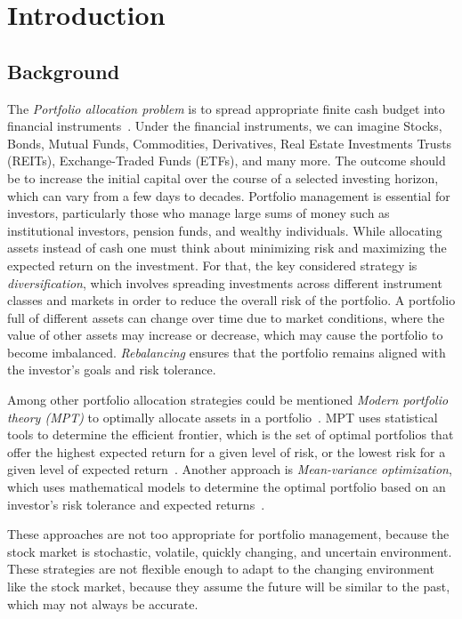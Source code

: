 \documentclass[../xlapes02]{subfiles}
\begin{document}
    \chapter{Introduction}\label{ch:introduction}


    \section{Background}\label{sec:background}
    The \emph{Portfolio allocation problem} is to spread appropriate finite cash budget into financial instruments~\cite{Model-Free-Reinforcement-Learning-for-Asset-Allocation}. Under the financial instruments, we can imagine Stocks, Bonds, Mutual Funds, Commodities, Derivatives, Real Estate Investments Trusts (REITs), Exchange-Traded Funds (ETFs), and many more. The outcome should be to increase the initial capital over the course of a selected investing horizon, which can vary from a few days to decades. Portfolio management is essential for investors, particularly those who manage large sums of money such as institutional investors, pension funds, and wealthy individuals. While allocating assets instead of cash one must think about minimizing risk and maximizing the expected return on the investment. For that, the key considered strategy is \emph{diversification}, which involves spreading investments across different instrument classes and markets in order to reduce the overall risk of the portfolio. A portfolio full of different assets can change over time due to market conditions, where the value of other assets may increase or decrease, which may cause the portfolio to become imbalanced. \emph{Rebalancing} ensures that the portfolio remains aligned with the investor's goals and risk tolerance.

    Among other portfolio allocation strategies could be mentioned \emph{Modern portfolio theory (MPT)} to optimally allocate assets in a portfolio~\cite{enwiki:1043516653}. MPT uses statistical tools to determine the efficient frontier, which is the set of optimal portfolios that offer the highest expected return for a given level of risk, or the lowest risk for a given level of expected return~\cite{sirucek-2015}. Another approach is \emph{Mean-variance optimization}, which uses mathematical models to determine the optimal portfolio based on an investor's risk tolerance and expected returns~\cite{meanvarianceportfoliooptimazation}.

    These approaches are not too appropriate for portfolio management, because the stock market is stochastic, volatile, quickly changing, and uncertain environment. These strategies are not flexible enough to adapt to the changing environment like the stock market, because they assume the future will be similar to the past, which may not always be accurate.
\end{document}
